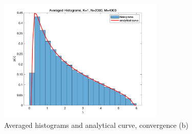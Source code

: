 \documentclass[twoside]{homework}
\begin{document}
\begin{figure}[!h]
\begin{center}
\includegraphics[width=0.70\textwidth]{HW0_2_c_1_2000_4000.png}
\end{center}
\caption{Averaged histograms and analytical curve, convergence (b)}
\label{fig:HW0_2_c_b}
\end{figure}
\end{document}
